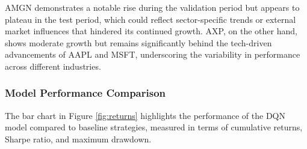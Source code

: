 \documentclass[conference]{IEEEtran}
\begin{document}
AMGN demonstrates a notable rise during the validation period but appears to plateau in the test period, which could reflect sector-specific trends or external market influences that hindered its continued growth. AXP, on the other hand, shows moderate growth but remains significantly behind the tech-driven advancements of AAPL and MSFT, underscoring the variability in performance across different industries.

\subsubsection{Model Performance Comparison}
The bar chart in Figure \ref{fig:returns} highlights the performance of the DQN model compared to baseline strategies, measured in terms of cumulative returns, Sharpe ratio, and maximum drawdown.
\end{document}
